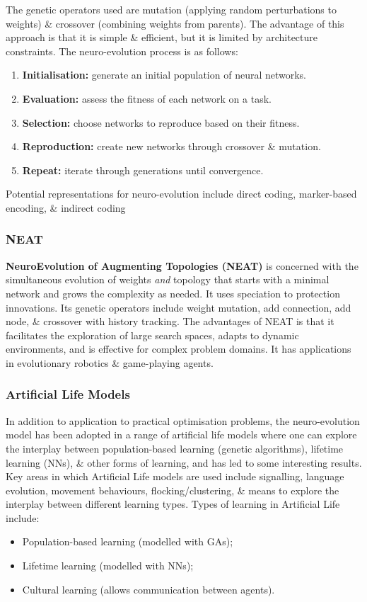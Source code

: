 \documentclass[a4paper,11pt]{article}
\begin{document}
The genetic operators used are mutation (applying random perturbations to weights) \& crossover (combining weights from parents).
The advantage of this approach is that it is simple \& efficient, but it is limited by architecture constraints.
The neuro-evolution process is as follows:
\begin{enumerate}
    \item   \textbf{Initialisation:} generate an initial population of neural networks.
    \item   \textbf{Evaluation:} assess the fitness of each network on a task.
    \item   \textbf{Selection:} choose networks to reproduce based on their fitness.
    \item   \textbf{Reproduction:} create new networks through crossover \& mutation.
    \item   \textbf{Repeat:} iterate through generations until convergence.
\end{enumerate}

Potential representations for neuro-evolution include direct coding, marker-based encoding, \& indirect coding

\subsubsection{NEAT}
\textbf{NeuroEvolution of Augmenting Topologies (NEAT)} is concerned with the simultaneous evolution of weights \textit{and} topology that starts with a minimal network and grows the complexity as needed.
It uses speciation to protection innovations.
Its genetic operators include  weight mutation, add connection, add node, \& crossover with history tracking.
The advantages of NEAT is that it facilitates the exploration of large search spaces, adapts to dynamic environments, and is effective for complex problem domains.
It has applications in evolutionary robotics \& game-playing agents.

\subsubsection{Artificial Life Models}
In addition to application to practical optimisation problems, the neuro-evolution model has been adopted in a range of artificial life models where one can explore the interplay between population-based learning (genetic algorithms), lifetime learning (NNs), \& other forms of learning, and has led to some interesting results.
Key areas in which Artificial Life models are used include signalling, language evolution, movement behaviours, flocking/clustering, \& means to explore the interplay between different learning types.
Types of learning in Artificial Life include:
\begin{itemize}
    \item   Population-based learning (modelled with GAs);
    \item   Lifetime learning (modelled with NNs);
    \item   Cultural learning (allows communication between agents).
\end{itemize}
\end{document}
